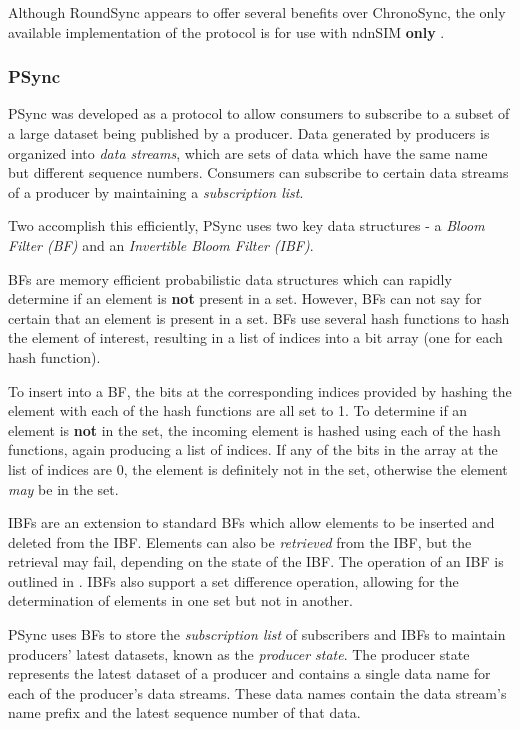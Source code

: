 Although RoundSync appears to offer several benefits over ChronoSync, the only available implementation of the protocol is for use with ndnSIM \textbf{only} \cite{roundsync-github}.

\subsubsection*{PSync}
PSync was developed as a protocol to allow consumers to subscribe to a subset of a large dataset being published by a producer. Data generated by producers is organized into \textit{data streams}, which are sets of data which have the same name but different sequence numbers. Consumers can subscribe to certain data streams of a producer by maintaining a \textit{subscription list}.

Two accomplish this efficiently, PSync uses two key data structures - a \textit{Bloom Filter (BF)} and an \textit{Invertible Bloom Filter (IBF)}. 

BFs are memory efficient probabilistic data structures which can rapidly determine if an element is \textbf{not} present in a set. However, BFs can not say for certain that an element is present in a set. BFs use several hash functions to hash the element of interest, resulting in a list of indices into a bit array (one for each hash function). 

To insert into a BF, the bits at the corresponding indices provided by hashing the element with each of the hash functions are all set to 1. To determine if an element is \textbf{not} in the set, the incoming element is hashed using each of the hash functions, again producing a list of indices. If any of the bits in the array at the list of indices are 0, the element is definitely not in the set, otherwise the element \textit{may} be in the set. 

IBFs are an extension to standard BFs which allow elements to be inserted and deleted from the IBF. Elements can also be \textit{retrieved} from the IBF, but the retrieval may fail, depending on the state of the IBF. The operation of an IBF is outlined in . IBFs also support a set difference operation, allowing for the determination of elements in one set but not in another. 

PSync uses BFs to store the \textit{subscription list} of subscribers and IBFs to maintain producers' latest datasets, known as the \textit{producer state}. The producer state represents the latest dataset of a producer and contains a single data name for each of the producer's data streams. These data names contain the data stream's name prefix and the latest sequence number of that data.  

